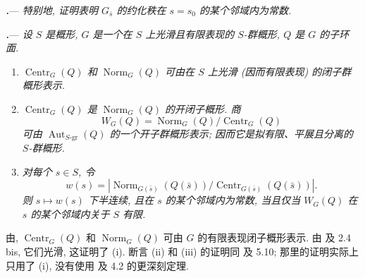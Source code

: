 \par\medskip\noindent
{}\textbf{\textit{.}}---
\textit{特别地, 证明表明 \(G_{\bar s}\) 的约化秩在 \(s=s_0\) 的某个邻域内为常数.}

\par\medskip\noindent
{}\textbf{\textit{.}}---
\textit{设 \(S\) 是概形, \(G\) 是一个在 \(S\) 上光滑且有限表现的 \(S\)-群概形, \(Q\) 是 \(G\) 的子环面.}
\begin{enumerate}
\item[\textup{(i)}]
\textit{\(\operatorname{Centr}_G(Q)\) 和 \(\operatorname{Norm}_G(Q)\) 可由在 \(S\) 上光滑 \textup{(因而有限表现)} 的闭子群概形表示.}
\item[\textup{(ii)}]
\textit{\(\operatorname{Centr}_G(Q)\) 是 \(\operatorname{Norm}_G(Q)\) 的开闭子概形. 商}
\[
  W_G(Q)
  =
  \operatorname{Norm}_G(Q)/\operatorname{Centr}_G(Q)
\]
\textit{可由 \(\operatorname{Aut}_{S\text{-}\mathrm{gr}}(Q)\) 的一个开子群概形表示; 因而它是拟有限、平展且分离的 \(S\)-群概形.}
\item[\textup{(iii)}]
\textit{对每个 \(s\in S\), 令}
\[
  w(s)
  =
  \left|
  \operatorname{Norm}_{G(\bar s)}(Q(\bar s))/
  \operatorname{Centr}_{G(\bar s)}(Q(\bar s))
  \right|.
\]
\textit{则 \(s\longmapsto w(s)\) 下半连续, 且在 \(s\) 的某个邻域内为常数, 当且仅当 \(W_G(Q)\) 在 \(s\) 的某个邻域内关于 \(S\) 有限.}
\end{enumerate}

由, \(\operatorname{Centr}_G(Q)\) 和 \(\operatorname{Norm}_G(Q)\) 可由 \(G\) 的有限表现闭子概形表示. 由 及 2.4 bis, 它们光滑, 这证明了 \textup{(i)}. 断言 \textup{(ii)} 和 \textup{(iii)} 的证明同 及 5.10; 那里的证明实际上只用了 \textup{(i)}, 没有使用 及 4.2 的更深刻定理.

